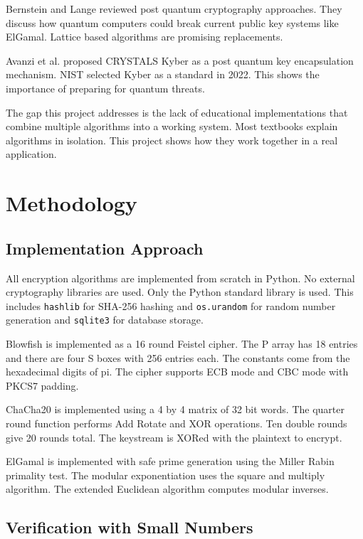 \documentclass[12pt,a4paper]{article}
\begin{document}
Bernstein and Lange \cite{bernstein2017} reviewed post quantum cryptography approaches. They discuss how quantum computers could break current public key systems like ElGamal. Lattice based algorithms are promising replacements.

Avanzi et al. \cite{avanzi2019} proposed CRYSTALS Kyber as a post quantum key encapsulation mechanism. NIST selected Kyber as a standard in 2022. This shows the importance of preparing for quantum threats.

The gap this project addresses is the lack of educational implementations that combine multiple algorithms into a working system. Most textbooks explain algorithms in isolation. This project shows how they work together in a real application.


\section{Methodology}

\subsection{Implementation Approach}

All encryption algorithms are implemented from scratch in Python. No external cryptography libraries are used. Only the Python standard library is used. This includes \texttt{hashlib} for SHA-256 hashing and \texttt{os.urandom} for random number generation and \texttt{sqlite3} for database storage.

Blowfish is implemented as a 16 round Feistel cipher. The P array has 18 entries and there are four S boxes with 256 entries each. The constants come from the hexadecimal digits of pi. The cipher supports ECB mode and CBC mode with PKCS7 padding.

ChaCha20 is implemented using a 4 by 4 matrix of 32 bit words. The quarter round function performs Add Rotate and XOR operations. Ten double rounds give 20 rounds total. The keystream is XORed with the plaintext to encrypt.

ElGamal is implemented with safe prime generation using the Miller Rabin primality test. The modular exponentiation uses the square and multiply algorithm. The extended Euclidean algorithm computes modular inverses.

\subsection{Verification with Small Numbers}
\end{document}
